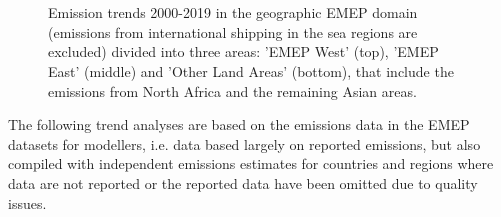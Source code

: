 \begin{figure}
\centering
     \\
     \\
\caption{Emission trends 2000-2019 in the geographic EMEP domain (emissions from international shipping in the sea regions are excluded) divided into three areas: 'EMEP West' (top), 'EMEP East' (middle) and 'Other Land Areas' (bottom), that include the emissions from North Africa and the remaining Asian areas. }
\label{fig:CEIP9}
\end{figure}

The following trend analyses are based on the emissions data in the EMEP datasets for modellers, i.e. data based largely on reported emissions, but also compiled with independent emissions estimates for countries and regions where data are not reported or the reported data have been omitted due to quality issues.

